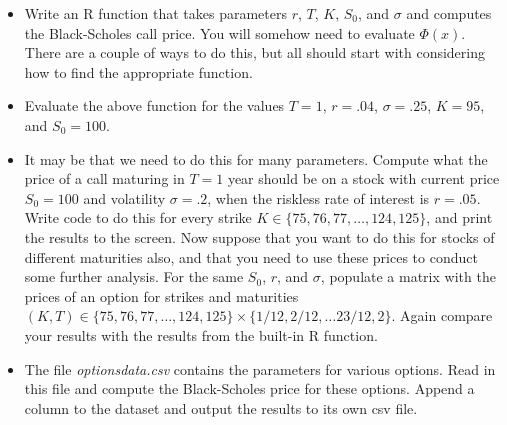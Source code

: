 \documentclass[12pt]{article}
\begin{document}
\begin{itemize}
\item Write an R function that takes parameters $r$, $T$, $K$,
  $S_0$, and $\sigma$ and computes the Black-Scholes call price. You
  will somehow need to evaluate $\Phi(x)$. There are a couple of ways
  to do this, but all should start with considering how to find the
  appropriate function.
\item Evaluate the above function for the values $T=1$, $r=.04$,
  $\sigma=.25$, $K=95$, and $S_0 = 100$.
\item It may be that we need to do this for many parameters.  Compute
  what the price of a call maturing in $T = 1$ year should be on a
  stock with current price $S_0 = 100$ and volatility $\sigma = .2$,
  when the riskless rate of interest is $r = .05$. Write code to do
  this for every strike $K \in \{75, 76, 77, \ldots, 124, 125\}$, and
  print the results to the screen.  Now suppose that you want to do
  this for stocks of different maturities also, and that you need to
  use these prices to conduct some further analysis. For the same
  $S_0$, $r$, and $\sigma$, populate a matrix with the prices of an
  option for strikes and maturities $(K,T) \in \{75, 76, 77, \ldots,
  124, 125\} \times \{1/12, 2/12, \ldots 23/12, 2\}$. Again compare
  your results with the results from the built-in R function.
\item The file \emph{optionsdata.csv} contains the parameters for various
options. Read in this file and compute the Black-Scholes price for
these options. Append a column to the dataset and output the results
to its own csv file.
\end{itemize}

 
\end{document}
